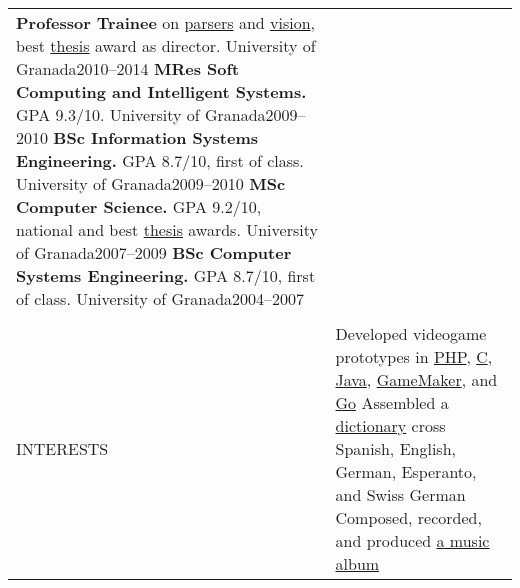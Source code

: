 \documentclass[letterpaper,10pt,oneside]{article}
\newcommand{\DatestampY}[1]{#1}
\newenvironment{body}
{\par\par
\begin{longtable}{p{0.125\textwidth}p{0.84\textwidth}}}
{\par\end{longtable}\par}
\renewcommand{\section}[3]{\\[-0.7cm]\pdfbookmark[2]{#2}{#3}\\%
\raggedleft  %
{\fontsize{9.5pt}{9.5pt}\selectfont\bfseries\raggedright%
\MakeUppercase{#1}}&}
\begin{document}
\begin{body}
\textbf{Professor Trainee} on \href{https://github.com/lquesada/ModelCC}{parsers} and \href{https://github.com/lquesada/MotionTracking}{vision}, best \href{https://github.com/lquesada/ADAgio}{thesis} award as director. University of Granada\hfill \DatestampY{2010}--\DatestampY{2014} \newline
\textbf{MRes Soft Computing and Intelligent Systems.} GPA 9.3/10. University of Granada\hfill \DatestampY{2009}--\DatestampY{2010} \newline
\textbf{BSc Information Systems Engineering.} GPA 8.7/10, first of class. University of Granada\hfill \DatestampY{2009}--\DatestampY{2010} \newline
\textbf{MSc Computer Science.} GPA 9.2/10, national and best \href{https://github.com/lquesada/JSimil}{thesis} awards. University of Granada\hfill \DatestampY{2007}--\DatestampY{2009} \newline
\textbf{BSc Computer Systems Engineering.} GPA 8.7/10, first of class. University of Granada\hfill \DatestampY{2004}--\DatestampY{2007}


\section{Interests}{Interests}{PDF:Interests}

Developed videogame prototypes in \href{https://github.com/lquesada/LifoSource}{PHP}, \href{https://github.com/lquesada/SpaceARMy}{C}, \href{https://github.com/lquesada/RogueCave}{Java}, \href{https://github.com/lquesada/PhysicsEngine}{GameMaker}, and \href{https://github.com/lquesada/Cavernal}{Go} \newline
Assembled a \href{https://github.com/lquesada/Lingvaro}{dictionary} cross Spanish, English, German, Esperanto, and Swiss German \newline
Composed, recorded, and produced \href{https://elezeta.com}{a music album}

\end{body}
\end{document}

